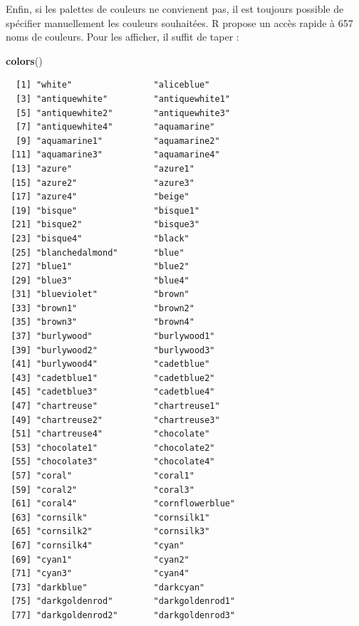 \documentclass[a4paperpaper,]{article}
\newenvironment{Shaded}{\begin{snugshade}}{\end{snugshade}}
\newcommand{\KeywordTok}[1]{\textcolor[rgb]{0.12,0.11,0.11}{\textbf{#1}}}
\newcommand{\NormalTok}[1]{\textcolor[rgb]{0.12,0.11,0.11}{#1}}
\begin{document}
Enfin, si les palettes de couleurs ne convienent pas, il est toujours possible de spécifier manuellement les couleurs souhaitées. R propose un accès rapide à 657 noms de couleurs. Pour les afficher, il suffit de taper :

\begin{Shaded}
\begin{Highlighting}[]
\KeywordTok{colors}\NormalTok{()}
\end{Highlighting}
\end{Shaded}

\begin{verbatim}
  [1] "white"                "aliceblue"           
  [3] "antiquewhite"         "antiquewhite1"       
  [5] "antiquewhite2"        "antiquewhite3"       
  [7] "antiquewhite4"        "aquamarine"          
  [9] "aquamarine1"          "aquamarine2"         
 [11] "aquamarine3"          "aquamarine4"         
 [13] "azure"                "azure1"              
 [15] "azure2"               "azure3"              
 [17] "azure4"               "beige"               
 [19] "bisque"               "bisque1"             
 [21] "bisque2"              "bisque3"             
 [23] "bisque4"              "black"               
 [25] "blanchedalmond"       "blue"                
 [27] "blue1"                "blue2"               
 [29] "blue3"                "blue4"               
 [31] "blueviolet"           "brown"               
 [33] "brown1"               "brown2"              
 [35] "brown3"               "brown4"              
 [37] "burlywood"            "burlywood1"          
 [39] "burlywood2"           "burlywood3"          
 [41] "burlywood4"           "cadetblue"           
 [43] "cadetblue1"           "cadetblue2"          
 [45] "cadetblue3"           "cadetblue4"          
 [47] "chartreuse"           "chartreuse1"         
 [49] "chartreuse2"          "chartreuse3"         
 [51] "chartreuse4"          "chocolate"           
 [53] "chocolate1"           "chocolate2"          
 [55] "chocolate3"           "chocolate4"          
 [57] "coral"                "coral1"              
 [59] "coral2"               "coral3"              
 [61] "coral4"               "cornflowerblue"      
 [63] "cornsilk"             "cornsilk1"           
 [65] "cornsilk2"            "cornsilk3"           
 [67] "cornsilk4"            "cyan"                
 [69] "cyan1"                "cyan2"               
 [71] "cyan3"                "cyan4"               
 [73] "darkblue"             "darkcyan"            
 [75] "darkgoldenrod"        "darkgoldenrod1"      
 [77] "darkgoldenrod2"       "darkgoldenrod3"      

\end{verbatim}
\end{document}
